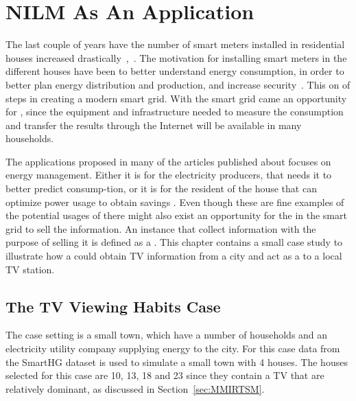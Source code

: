 \chapter{NILM As An Application} 
\label{sec:CaseStudy}
The last couple of years have the number of smart meters installed in residential houses increased drastically~\citep{RefWorks:44},~\citep{RefWorks:45}. The motivation for installing smart meters in the different houses have been to better understand energy consumption, in order to better plan energy distribution and production, and increase security~\citep{RefWorks:43}. This on of steps in creating a modern smart grid. With the smart grid came an opportunity for , since the equipment and infrastructure needed to measure the consumption and transfer the results through the Internet will be available in many households. 

The applications proposed in many of the articles published about  focuses on energy management. Either it is for the electricity producers, that needs it to better predict consump-tion, or it is for the resident of the house that can optimize power usage to obtain savings \citep{RefWorks:17}. Even though these are fine examples of the potential usages of  there might also exist an opportunity for the  in the smart grid to sell the  information. An instance that collect information with the purpose of selling it is defined as a . This chapter contains a small case study to illustrate how a  could obtain TV information from a city and act as a  to a local TV station. 

\section{The TV Viewing Habits Case}
The case setting is a small town, which have a number of households and an electricity utility company supplying energy to the city. For this case data from the SmartHG dataset is used to simulate a small town with 4 houses. The houses selected for this case are 10, 13, 18 and 23  since they contain a TV that are relatively dominant, as discussed in Section~\ref{sec:MMIRTSM}. 

